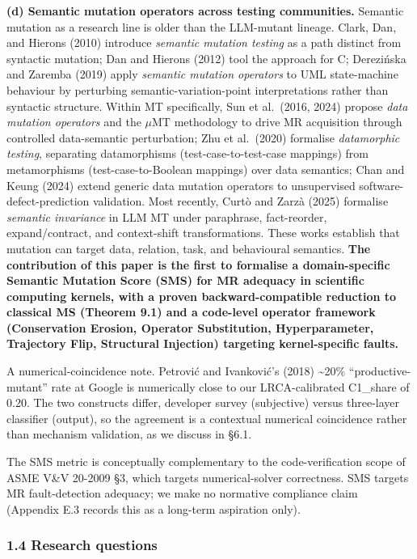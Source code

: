 \documentclass[review,12pt,authoryear]{elsarticle}
\begin{document}
\textbf{(d) Semantic mutation operators across testing communities.}
Semantic mutation as a research line is older than the LLM-mutant
lineage. Clark, Dan, and Hierons (2010) introduce \emph{semantic
mutation testing} as a path distinct from syntactic mutation; Dan and
Hierons (2012) tool the approach for C; Derezińska and Zaremba (2019)
apply \emph{semantic mutation operators} to UML state-machine behaviour
by perturbing semantic-variation-point interpretations rather than
syntactic structure. Within MT specifically, Sun et al.~(2016, 2024)
propose \emph{data mutation operators} and the $\mu$MT methodology to drive
MR acquisition through controlled data-semantic perturbation; Zhu et
al.~(2020) formalise \emph{datamorphic testing}, separating
datamorphisms (test-case-to-test-case mappings) from metamorphisms
(test-case-to-Boolean mappings) over data semantics; Chan and Keung
(2024) extend generic data mutation operators to unsupervised
software-defect-prediction validation. Most recently, Curtò and Zarzà
(2025) formalise \emph{semantic invariance} in LLM MT under paraphrase,
fact-reorder, expand/contract, and context-shift transformations. These
works establish that mutation can target data, relation, task, and
behavioural semantics. \textbf{The contribution of this paper is the
first to formalise a domain-specific Semantic Mutation Score (SMS) for
MR adequacy in scientific computing kernels, with a proven
backward-compatible reduction to classical MS (Theorem 9.1) and a
code-level operator framework (Conservation Erosion, Operator
Substitution, Hyperparameter, Trajectory Flip, Structural Injection)
targeting kernel-specific faults.}

A numerical-coincidence note. Petrović and Ivanković's (2018)
\textasciitilde20\% ``productive-mutant'' rate at Google is numerically
close to our LRCA-calibrated C1\_share of 0.20. The two constructs
differ, developer survey (subjective) versus three-layer classifier
(output), so the agreement is a contextual numerical coincidence rather
than mechanism validation, as we discuss in §6.1.

The SMS metric is conceptually complementary to the code-verification
scope of ASME V\&V 20-2009 §3, which targets numerical-solver
correctness. SMS targets MR fault-detection adequacy; we make no
normative compliance claim (Appendix E.3 records this as a long-term
aspiration only).

\subsubsection{1.4 Research questions}\label{research-questions}
\end{document}
